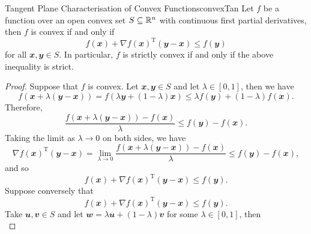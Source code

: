 \documentclass[math, code]{amznotes}
\theoremstyle{remark}
\begin{document}
\begin{probox}{Tangent Plane Characterisation of Convex Functions}{convexTan}
    Let $f$ be a function over an open convex set $S \subseteq \mathbb{R}^n$ with continuous first partial derivatives, then $f$ is convex if and only if 
    \begin{equation*}
        f(\mathbfit{x}) + \nabla f(\mathbfit{x})^{\mathrm{T}}(\mathbfit{y - x}) \leq f(\mathbfit{y})
    \end{equation*}
    for all $\mathbfit{x}, \mathbfit{y} \in S$. In particular, $f$ is strictly convex if and only if the above inequality is strict.
    \tcblower   
    \begin{proof}
        Suppose that $f$ is convex. Let $\mathbfit{x}, \mathbfit{y} \in S$ and let $\lambda \in [0, 1]$, then we have
        \begin{equation*}
            f\left(\mathbfit{x} + \lambda(\mathbfit{y} - \mathbfit{x})\right) = f\left(\lambda\mathbfit{y} + (1 - \lambda)\mathbfit{x}\right) \leq \lambda f(\mathbfit{y}) + (1 - \lambda)f(\mathbfit{x}).
        \end{equation*} 
        Therefore,
        \begin{equation*}
            \frac{f\left(\mathbfit{x} + \lambda(\mathbfit{y} - \mathbfit{x})\right) - f(\mathbfit{x})}{\lambda} \leq f(\mathbfit{y}) - f(\mathbfit{x}).
        \end{equation*}
        Taking the limit as $\lambda \to 0$ on both sides, we have
        \begin{equation*}
            \nabla f(\mathbfit{x})^{\mathrm{T}}(\mathbfit{y - x}) = \lim_{\lambda \to 0}\frac{f\left(\mathbfit{x} + \lambda(\mathbfit{y} - \mathbfit{x})\right) - f(\mathbfit{x})}{\lambda} \leq f(\mathbfit{y}) - f(\mathbfit{x}),
        \end{equation*}
        and so
        \begin{equation*}
            f(\mathbfit{x}) + \nabla f(\mathbfit{x})^{\mathrm{T}}(\mathbfit{y - x}) \leq f(\mathbfit{y}).
        \end{equation*}
        Suppose conversely that 
        \begin{equation*}
            f(\mathbfit{x}) + \nabla f(\mathbfit{x})^{\mathrm{T}}(\mathbfit{y - x}) \leq f(\mathbfit{y}).
        \end{equation*}
        Take $\mathbfit{u}, \mathbfit{v} \in S$ and let $\mathbfit{w} = \lambda\mathbfit{u} + (1 - \lambda)\mathbfit{v}$ for some $\lambda \in [0, 1]$, then
        \begin{displaymath}

\end{displaymath}
\end{proof}
\end{probox}
\end{document}
